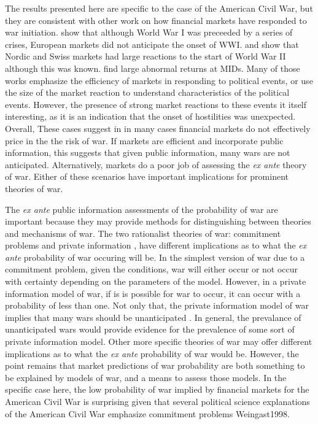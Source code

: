 \documentclass[11pt, oneside, article]{memoir}\usepackage[]{graphicx}\usepackage[]{color}
\begin{document}
The results presented here are specific to the case of the American Civil War, but they are consistent with other work on how financial markets have responded to war initiation.
\textcite{Ferguson2006} show that although World War I was preceeded by a series of crises, European markets did not anticipate the onset of WWI.
\textcite{FreyKucher2000} and \textcite{WaldenstromFrey2008} show that Nordic and Swiss markets had large reactions to the start of World War II although this was known.
\textcite{GuidolinLaFerrara2010} find large abnormal returns at MIDs.
Many of those works emphasize the efficiency of markets in responding to political events, or use the size of the market reaction to understand characteristics of the political events.
However, the presence of strong market reactions to these events it itself interesting, as it is an indication that the onset of hostilities was unexpected.
Overall, These cases suggest in in many cases financial markets do not effectively price in the the risk of war.
If markets are efficient and incorporate public information, this suggests that given public information, many wars are not anticipated.
Alternatively, markets do a poor job of assessing the \textit{ex ante} theory of war.
Either of these scenarios have important implications for prominent theories of war.

The \textit{ex ante} public information assessments of the probability of war are important because they may provide methods for distinguishing between theories and mechanisms of war.
The two rationalist theories of war: commitment problems and private information \parencites{Fearon1995,Powell2006}, have different implications as to what the \textit{ex ante} probability of war occuring will be.
In the simplest version of war due to a commitment problem, given the conditions, war will either occur or not occur with certainty depending on the parameters of the model.
However, in a private information model of war, if is is possible for war to occur, it can occur with a probability of less than one.
Not only that, the private information model of war implies that many wars should be unanticipated \parencite{Gartzke1999}.
In general, the prevalance of unanticipated wars would provide evidence for the prevalence of some sort of private information model.
Other more specific theories of war may offer different implications as to what the \textit{ex ante} probability of war would be.
However, the point remains that market predictions of war probability are both something to be explained by models of war, and a means to assess those models.
In the specific case here, the low probability of war implied by financial markets for the American Civil War is surprising given that several political science  explanations of the American Civil War emphasize commitment problems \parencite{Reiter2009}{Weingast1998}.
\end{document}
